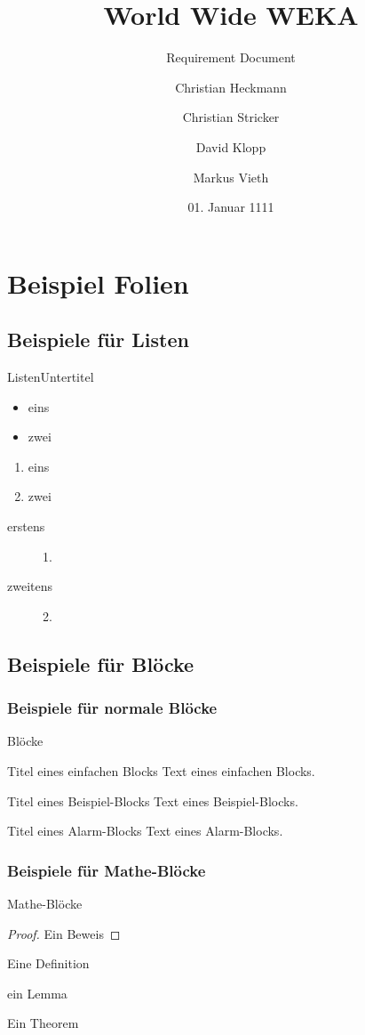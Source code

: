 \documentclass{beamer}
\title[WWWEKA]{World Wide WEKA}
\subtitle{Requirement Document}
\author[C. Heckmann\and C. Stricker\and D. Klopp\and M. Vieth]{Christian Heckmann\and Christian Stricker\and David Klopp\and Markus Vieth}
\date[01.01.1111]{01. Januar 1111}
\begin{document}
	
	\frame{
		\titlepage
	}
	
	\section[Beispiele]{Beispiel Folien}
	\subsection[Listen]{Beispiele für Listen}
	\begin{frame}[<+->][t]{Listen}{Untertitel}
		\begin{itemize}
			\item eins
			\item zwei
		\end{itemize}
		\begin{enumerate}
			\item eins
			\item zwei
		\end{enumerate}
		\begin{description}
			\item[erstens] 1.
			\item[zweitens] 2.
		\end{description}
	\end{frame}
	\subsection[Blöcke]{Beispiele für Blöcke}
	\subsubsection[Nomal]{Beispiele für normale Blöcke}
	\begin{frame}{Blöcke}
		
		\begin{block}{Titel eines einfachen Blocks}
			Text eines einfachen Blocks.
		\end{block}
		\begin{exampleblock}{Titel eines Beispiel-Blocks}
			Text eines Beispiel-Blocks.
		\end{exampleblock}
		\begin{alertblock}{Titel eines Alarm-Blocks}
			Text eines Alarm-Blocks.
		\end{alertblock}
	\end{frame}
	\subsubsection[Mathe]{Beispiele für Mathe-Blöcke}
	\begin{frame}{Mathe-Blöcke}
		\begin{proof}
			Ein Beweis
		\end{proof}
		\begin{definition}
			Eine Definition
		\end{definition}
		\begin{lemma}
			ein Lemma
		\end{lemma}
		\begin{theorem}
			Ein Theorem
		\end{theorem}
	\end{frame}
\end{document}
